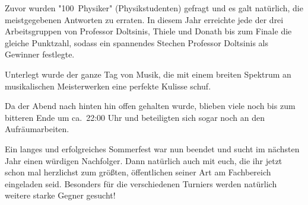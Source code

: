 \begin{multicols*}{2}
Zuvor wurden "100~Physiker" (Physikstudenten) gefragt und es galt natürlich, die meistgegebenen Antworten zu erraten. In diesem Jahr erreichte jede der drei Arbeitsgruppen von Professor Doltsinis, Thiele und Donath bis zum Finale die gleiche Punktzahl, sodass ein spannendes Stechen Professor Doltsinis als Gewinner festlegte. 

Unterlegt wurde der ganze Tag von Musik, die mit einem breiten Spektrum an musikalischen Meisterwerken eine perfekte Kulisse schuf.

Da der Abend nach hinten hin offen gehalten wurde, blieben viele noch bis zum bitteren Ende um ca.~22:00 Uhr und beteiligten sich sogar noch an den Aufräumarbeiten.

Ein langes und erfolgreiches Sommerfest war nun beendet und sucht im nächsten Jahr einen würdigen Nachfolger. Dann natürlich auch mit euch, die ihr jetzt schon mal herzlichst zum größten, öffentlichen seiner Art am Fachbereich eingeladen seid. Besonders für die verschiedenen Turniers werden natürlich weitere starke Gegner gesucht!


\end{multicols*}

